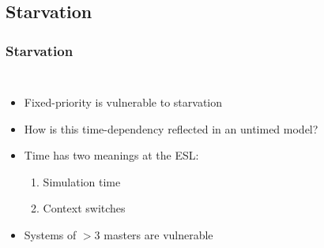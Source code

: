 \documentclass[]{beamer}
\begin{document}
\subsection{Starvation}
 \begin{frame}
  \frametitle{Starvation}
   \begin{columns}
       \begin{itemize}
         \item<1-> Fixed-priority is vulnerable to starvation
         \item<2-> How is this time-dependency reflected in an untimed model?
         \item<3-> Time has two meanings at the ESL: 
          \begin{enumerate}
           \item<3-> Simulation time
           \item<3-> Context switches
          \end{enumerate}
         \item<4-> Systems of $>$3 masters are vulnerable 
       \end{itemize}

\end{columns}
\end{frame}
\end{document}
